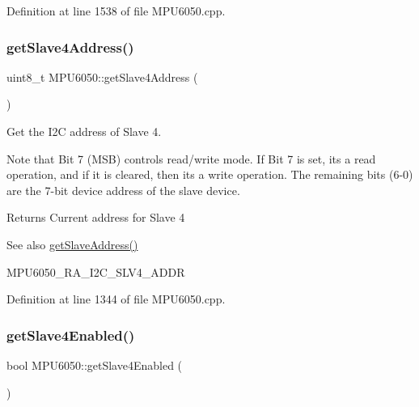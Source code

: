 Definition at line 1538 of file M\+P\+U6050.\+cpp.

\mbox{\label{classMPU6050_a4278dec5fec25be9a6f45b51a3373ad2}} 
\subsubsection{\texorpdfstring{getSlave4Address()}{getSlave4Address()}}
{\footnotesize\ttfamily uint8\+\_\+t M\+P\+U6050\+::get\+Slave4\+Address (\begin{DoxyParamCaption}{ }\end{DoxyParamCaption})}



Get the I2C address of Slave 4. 

Note that Bit 7 (M\+SB) controls read/write mode. If Bit 7 is set, it\textquotesingle{}s a read operation, and if it is cleared, then it\textquotesingle{}s a write operation. The remaining bits (6-\/0) are the 7-\/bit device address of the slave device.

\begin{DoxyReturn}{Returns}
Current address for Slave 4 
\end{DoxyReturn}
\begin{DoxySeeAlso}{See also}
\mbox{\hyperlink{classMPU6050_af75b9f7ccac48515c7544238db0e6863}{get\+Slave\+Address()}} 

M\+P\+U6050\+\_\+\+R\+A\+\_\+\+I2\+C\+\_\+\+S\+L\+V4\+\_\+\+A\+D\+DR 
\end{DoxySeeAlso}


Definition at line 1344 of file M\+P\+U6050.\+cpp.

\mbox{\label{classMPU6050_a4b9e13d6776ba99e042773873557bedd}} 
\subsubsection{\texorpdfstring{getSlave4Enabled()}{getSlave4Enabled()}}
{\footnotesize\ttfamily bool M\+P\+U6050\+::get\+Slave4\+Enabled (\begin{DoxyParamCaption}{ }\end{DoxyParamCaption})}



